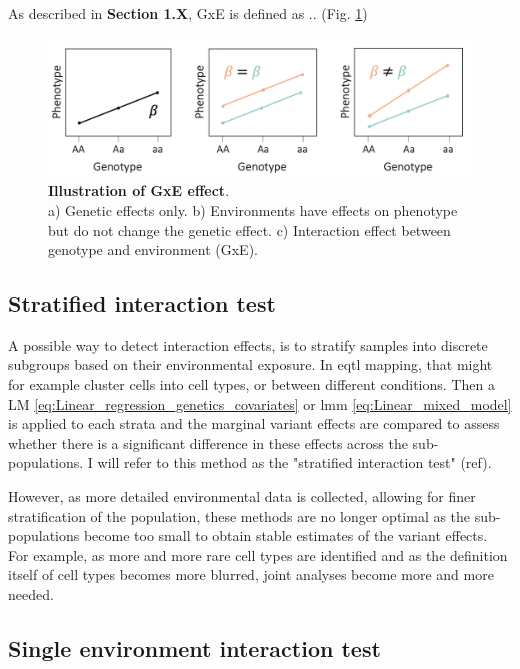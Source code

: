 As described in \textbf{Section 1.X}, GxE is defined as .. (Fig. \ref{fig:gxe})

\begin{figure}[h]
\centering
\includegraphics[width=15cm]{Chapter1/Fig/GxE.png}
\caption[\textbf{Illustration of GxE}]{\textbf{Illustration of GxE effect}.\\
a) Genetic effects only. b) Environments have effects on phenotype but do not change the genetic effect. c) Interaction effect between genotype and environment (GxE).}
\label{fig:gxe}
\end{figure}

\subsection{Stratified interaction test}

A possible way to detect interaction effects, is to stratify samples into discrete subgroups based on their environmental exposure.
In e\gls{qtl} mapping, that might for example cluster cells into cell types, or between different conditions.
Then a LM \eqref{eq:Linear_regression_genetics_covariates} or \gls{lmm} \eqref{eq:Linear_mixed_model} is applied to each strata and the marginal variant effects are compared to assess whether there is a significant difference in these effects across the sub-populations.
I will refer to this method as the "stratified interaction test" (ref).

However, as more detailed environmental data is collected, allowing for finer stratification of the population, these methods are no longer optimal as the sub-populations become too small to obtain stable estimates of the variant effects.
For example, as more and more rare cell types are identified and as the definition itself of cell types becomes more blurred, joint analyses become more and more needed. 


\subsection{Single environment interaction test}

